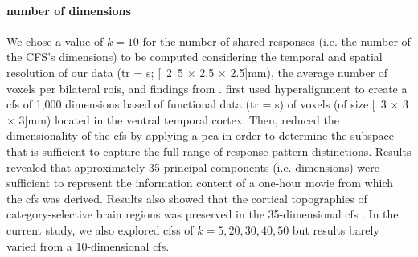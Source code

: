 \paragraph{number of dimensions}


We chose a value of $k=10$ for the number of shared responses (i.e. the number
of the CFS's dimensions) to be computed considering the temporal and spatial
resolution of our data (\ac{tr} = \unit[2]{s}; \unit[2.5 $\times$ 2.5 $\times$
2.5]{mm}), the average number of voxels per bilateral \acp{roi}, and findings
from \citet{haxby2011common}.
%
\citet{haxby2011common} first used hyperalignment to create a \ac{cfs} of 1,000
dimensions based of functional data (\ac{tr} = \unit[3]{s}) of voxels (of size
\unit[3 $\times$ 3 $\times$ 3]{mm}) located in the ventral temporal cortex.
%
Then, \citet{haxby2011common} reduced the dimensionality of the \ac{cfs} by
applying a \ac{pca} in order to determine the subspace that is sufficient to
capture the full range of response-pattern distinctions.
%
Results revealed that approximately 35 principal components (i.e. dimensions)
were sufficient to represent the information content of a one-hour movie from
which the \ac{cfs} was derived.
%
Results also showed that the cortical topographies of category-selective brain
regions was preserved in the 35-dimensional \ac{cfs} \citep{haxby2011common}.
%
In the current study, we also explored \acp{cfs} of $k=5, 20, 30, 40, 50$ but
results barely varied from a 10-dimensional \ac{cfs}.

%
%


